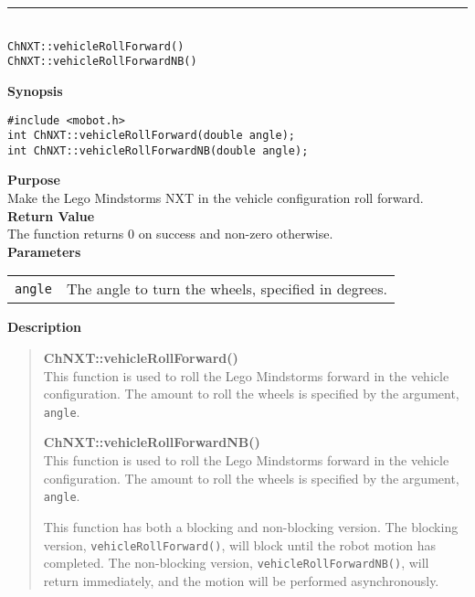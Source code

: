 \noindent
\vspace{5pt}
\rule{4.5in}{0.015in}\\
\noindent
{\LARGE \texttt{ChNXT::vehicleRollForward()}}\\
{\LARGE \texttt{ChNXT::vehicleRollForwardNB()}}\\
{}

\noindent
{\bf Synopsis}
\begin{lstlisting}
#include <mobot.h>
int ChNXT::vehicleRollForward(double angle);
int ChNXT::vehicleRollForwardNB(double angle);
\end{lstlisting}

\noindent
{\bf Purpose}\\
Make the Lego Mindstorms NXT in the vehicle configuration roll forward.\\

\noindent
{\bf Return Value}\\
The function returns 0 on success and non-zero otherwise.\\

\noindent
{\bf Parameters}\\
\vspace{-0.1in}
\begin{description}
\item               
\begin{tabular}{p{15 mm}p{145 mm}}
\texttt{angle} & The angle to turn the wheels, specified in degrees.\\
\end{tabular}
\end{description}

\noindent
{\bf Description}\\
\vspace{-12pt}
\begin{quote}
{\bf ChNXT::vehicleRollForward()}\\
This function is used to roll the Lego Mindstorms forward in the vehicle
configuration. The amount to roll the wheels is specified by the argument,
\texttt{angle}.

{\bf ChNXT::vehicleRollForwardNB()}\\
This function is used to roll the Lego Mindstorms forward in the vehicle
configuration. The amount to roll the wheels is specified by the argument,
\texttt{angle}.

This function has both a blocking and non-blocking version.
The blocking version, \texttt{vehicleRollForward()}, will block until the
robot motion has completed. The non-blocking version, \texttt{vehicleRollForwardNB()},
will return immediately, and the motion will be performed asynchronously.\\
\end{quote}

